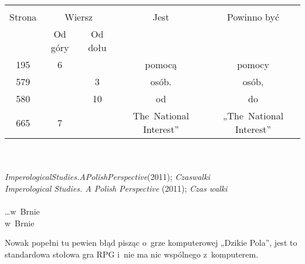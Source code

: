 \documentclass[a4paper,11pt]{article}
\begin{document}
\begin{center}

  \begin{tabular}{|c|c|c|c|c|}
    \hline
    & \multicolumn{2}{c|}{} & & \\
    Strona & \multicolumn{2}{c|}{Wiersz} & Jest
                              & Powinno być \\ \cline{2-3}
    & Od góry & Od dołu & & \\
    \hline
    195 &  6 & & pomocą & pomocy \\
    579 & &  3 & osób. & osób, \\
    580 & & 10 & od & do \\
    665 &  7 & & The~National Interest” & „The~National Interest” \\
    \hline
  \end{tabular}

\end{center}
\noi \\
 \\
\Jest \emph{ImperologicalStudies.APolishPerspective}(2011);
\emph{Czaswalki} \\
\Powin \emph{Imperological Studies. A Polish Perspective} (2011);
\emph{Czas walki} \\
 \\
\Jest \ldots w~Brnie \\
\Powin  w~Brnie \\

\vspace{\spaceTwo}










\start \Str{} Nowak popełni tu pewien błąd pisząc o~grze komputerowej
„Dzikie Pola”, jest to standardowa stołowa gra RPG i~nie ma nic
wspólnego z~komputerem.
\end{document}
